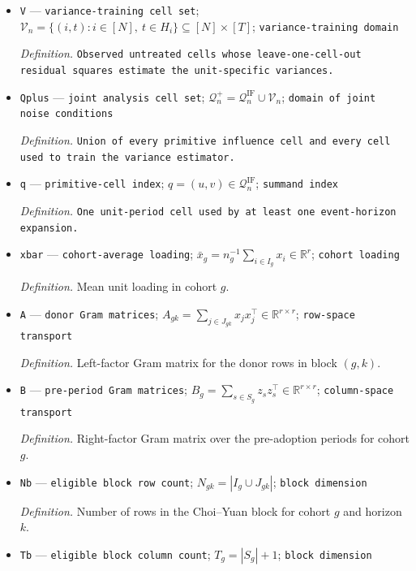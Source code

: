 \documentclass{article}
\begin{document}
\begin{itemize}
  \item \texttt{V} --- \texttt{variance-\allowbreak{}training cell set}; \(\mathcal V_n=\{(i,t):i\in[N],\ t\in H_i\}\subseteq[N]\times[T]\); \texttt{variance-\allowbreak{}training domain}
  \par\smallskip\noindent\emph{Definition.} \texttt{Observed untreated cells whose leave-\allowbreak{}one-\allowbreak{}cell-\allowbreak{}out residual squares estimate the unit-\allowbreak{}specific variances.}
  \item \texttt{Qplus} --- \texttt{joint analysis cell set}; \(\mathcal Q_n^+=\mathcal Q_n^{\mathrm{IF}}\cup\mathcal V_n\); \texttt{domain of joint noise conditions}
  \par\smallskip\noindent\emph{Definition.} \texttt{Union of every primitive influence cell and every cell used to train the variance estimator.}
  \item \texttt{q} --- \texttt{primitive-\allowbreak{}cell index}; \(q=(u,v)\in\mathcal Q_n^{\mathrm{IF}}\); \texttt{summand index}
  \par\smallskip\noindent\emph{Definition.} \texttt{One unit-\allowbreak{}period cell used by at least one event-\allowbreak{}horizon expansion.}
  \item \texttt{xbar} --- \texttt{cohort-\allowbreak{}average loading}; \(\bar x_g=n_g^{-1}\sum_{i\in I_g}x_i\in\mathbb R^r\); \texttt{cohort loading}
  \par\smallskip\noindent\emph{Definition.} Mean unit loading in cohort \(g\).
  \item \texttt{A} --- \texttt{donor Gram matrices}; \(A_{gk}=\sum_{j\in J_{gk}}x_jx_j^\top\in\mathbb R^{r\times r}\); \texttt{row-\allowbreak{}space transport}
  \par\smallskip\noindent\emph{Definition.} Left-factor Gram matrix for the donor rows in block \((g,k)\).
  \item \texttt{B} --- \texttt{pre-\allowbreak{}period Gram matrices}; \(B_g=\sum_{s\in S_g}z_sz_s^\top\in\mathbb R^{r\times r}\); \texttt{column-\allowbreak{}space transport}
  \par\smallskip\noindent\emph{Definition.} Right-factor Gram matrix over the pre-adoption periods for cohort \(g\).
  \item \texttt{Nb} --- \texttt{eligible block row count}; \(N_{gk}=|I_g\cup J_{gk}|\); \texttt{block dimension}
  \par\smallskip\noindent\emph{Definition.} Number of rows in the Choi--Yuan block for cohort \(g\) and horizon \(k\).
  \item \texttt{Tb} --- \texttt{eligible block column count}; \(T_g=|S_g|+1\); \texttt{block dimension}

\end{itemize}
\end{document}
